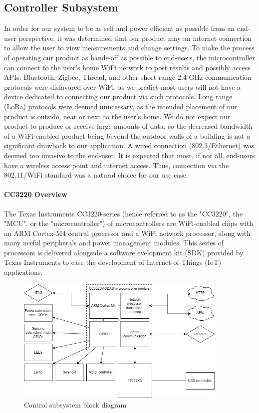 \subsection{Controller Subsystem}
\label{sec:controller_subsystem}
In order for our system to be as self and power efficient as
possible from an end-user perspective, it was determined that our product may an internet connection to allow the user to view measurements and change settings. To make the process of operating our product as hands-off as possible to end-users, the microcontroller can connect to the user's home WiFi network to post results and possibly access APIs. Bluetooth, Zigbee, Thread,
and other short-range 2.4 GHz communication protocols were disfavored over WiFi, as we predict most users will not have a device dedicated to connecting our product via such protocols. Long range (LoRa) protocols were deemed unncessary, as the intended placement of our product is outside, near or next to the user's home. We do not expect our product to produce or receive large amounts of data, so the decreased bandwidth of a WiFi-enabled product being beyond the outdoor walls of a building is not a significant drawback to our application. A wired connection (802.3/Ethernet) was deemed too invasive to the end-user. It is expected that most, if not all, end-users have a wireless access point and internet access. Thus, connection via the 802.11/WiFi standard was a natural choice for our use case.

\paragraph{CC3220 Overview}
The Texas Instruments CC3220-series (hence referred to as the "CC3220", the "MCU", or the "microcontroller") of microcontrollers are WiFi-enabled chips with an ARM Cortex-M4 central processor and a WiFi network processor, along with many useful peripherals and power management modules. This series of processors is delivered alongside a software  evelopment kit (SDK) provided by Texas Instruments to ease the development of Internet-of-Things (IoT) applications.

\begin{figure}[H]
    \caption{Control subsystem block diagram}
    \label{fig:control-block-diagram}
    \centering
    \includegraphics[width=0.9\textwidth]{images/control-block-diagram.png}
\end{figure}

